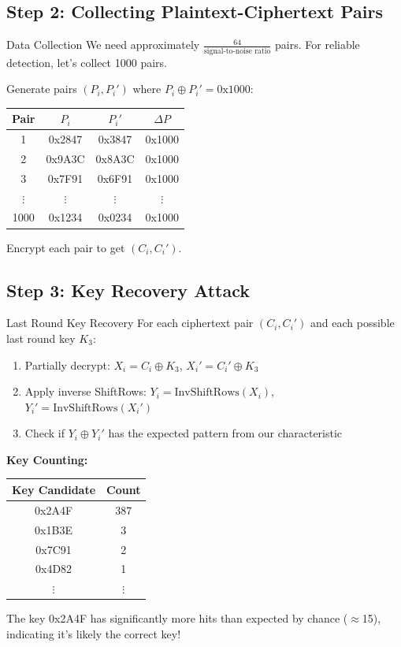 \documentclass[12pt,a4paper]{article}
\theoremstyle{definition}
\newcommand{\diff}{\Delta}
\begin{document}
\subsection{Step 2: Collecting Plaintext-Ciphertext Pairs}

\begin{examplebox}{Data Collection}
We need approximately $\frac{64}{\text{signal-to-noise ratio}}$ pairs. For reliable detection, let's collect 1000 pairs.

Generate pairs $(P_i, P_i')$ where $P_i \oplus P_i' = \text{0x1000}$:

\begin{center}
\begin{tabular}{cccc}
\textbf{Pair} & $P_i$ & $P_i'$ & $\diff P$ \\
\hline
1 & 0x2847 & 0x3847 & 0x1000 \\
2 & 0x9A3C & 0x8A3C & 0x1000 \\
3 & 0x7F91 & 0x6F91 & 0x1000 \\
$\vdots$ & $\vdots$ & $\vdots$ & $\vdots$ \\
1000 & 0x1234 & 0x0234 & 0x1000 \\
\end{tabular}
\end{center}

Encrypt each pair to get $(C_i, C_i')$.
\end{examplebox}

\subsection{Step 3: Key Recovery Attack}

\begin{examplebox}{Last Round Key Recovery}
For each ciphertext pair $(C_i, C_i')$ and each possible last round key $K_3$:

\begin{enumerate}
    \item Partially decrypt: $X_i = C_i \oplus K_3$, $X_i' = C_i' \oplus K_3$
    \item Apply inverse ShiftRows: $Y_i = \text{InvShiftRows}(X_i)$, $Y_i' = \text{InvShiftRows}(X_i')$  
    \item Check if $Y_i \oplus Y_i'$ has the expected pattern from our characteristic
\end{enumerate}

\textbf{Key Counting:}
\begin{center}
\begin{tabular}{cc}
\textbf{Key Candidate} & \textbf{Count} \\
\hline
0x2A4F & 387 \\
0x1B3E & 3 \\
0x7C91 & 2 \\
0x4D82 & 1 \\
$\vdots$ & $\vdots$ \\
\end{tabular}
\end{center}

The key 0x2A4F has significantly more hits than expected by chance ($\approx$15), indicating it's likely the correct key!
\end{examplebox}
\end{document}
